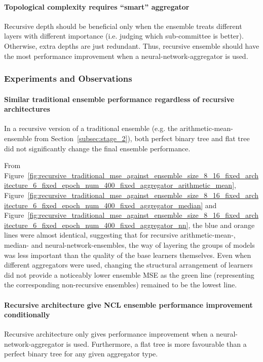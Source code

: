 \paragraph{Topological complexity requires ``smart'' aggregator}
Recursive depth should be beneficial only when the ensemble treats different layers with different importance (i.e. judging which sub-committee is better). Otherwise, extra depths are just redundant. Thus, recursive ensemble should have the most performance improvement when a neural-network-aggregator is used. 


\subsubsection{Experiments and Observations}
\label{subsubsec:evaluation_recursive_observations}
\paragraph{Similar traditional ensemble performance regardless of recursive architectures}
In a recursive version of a traditional ensemble (e.g. the arithmetic-mean-ensemble from Section~\ref{subsec:stage_2}), both perfect binary tree and flat tree did not significantly change the final ensemble performance. 

From Figure~\ref{fig:recursive_traditional_mse_against_ensemble_size_8_16_fixed_architecture_6_fixed_epoch_num_400_fixed_aggregator_arithmetic_mean}, Figure~\ref{fig:recursive_traditional_mse_against_ensemble_size_8_16_fixed_architecture_6_fixed_epoch_num_400_fixed_aggregator_median} and Figure~\ref{fig:recursive_traditional_mse_against_ensemble_size_8_16_fixed_architecture_6_fixed_epoch_num_400_fixed_aggregator_nn}, the blue and orange lines were almost identical, suggesting that for recursive arithmetic-mean-, median- and neural-network-ensembles, the way of layering the groups of models was less important than the quality of the base learners themselves. Even when different aggregators were used, changing the structural arrangement of learners did not provide a noticeably lower ensemble MSE as the green line (representing the corresponding non-recursive ensembles) remained to be the lowest line. 

\paragraph{Recursive architecture give NCL ensemble performance improvement conditionally}
Recursive architecture only gives performance improvement when a neural-network-aggregator is used. Furthermore, a flat tree is more favourable than a perfect binary tree for any given aggregator type. 

